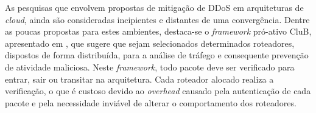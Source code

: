 

As pesquisas que envolvem propostas de mitigação de DDoS em arquiteturas de \emph{cloud}, ainda são consideradas incipientes e distantes de uma convergência. Dentre as poucas propostas para estes ambientes, destaca-se o \emph{framework} pró-ativo CluB, apresentado em \cite{Hazelhurst:2008:SCU:1456659.1456671}, que %
sugere
que sejam selecionados determinados roteadores, dispostos de forma distribuída, para a análise de tráfego e consequente prevenção de atividade maliciosa. %
Neste \emph{framework}, todo pacote %
 deve ser verificado para entrar, sair ou transitar na arquitetura. Cada roteador alocado realiza a verificação, o que é custoso devido ao \emph{overhead} causado pela autenticação de cada pacote e pela necessidade inviável de alterar o comportamento dos roteadores. %

